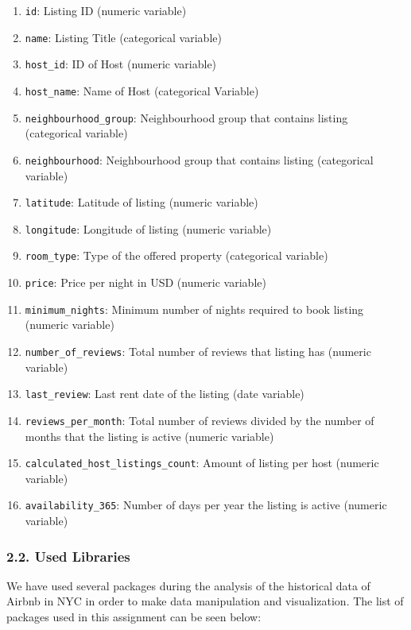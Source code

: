 \documentclass[
]{article}
\providecommand{\tightlist}{%
  \setlength{\itemsep}{0pt}\setlength{\parskip}{0pt}}
\begin{document}
\begin{enumerate}
\def\labelenumi{\arabic{enumi}.}
\tightlist
\item
  \texttt{id}: Listing ID (numeric variable)
\item
  \texttt{name}: Listing Title (categorical variable)
\item
  \texttt{host\_id}: ID of Host (numeric variable)
\item
  \texttt{host\_name}: Name of Host (categorical Variable)
\item
  \texttt{neighbourhood\_group}: Neighbourhood group that contains
  listing (categorical variable)
\item
  \texttt{neighbourhood}: Neighbourhood group that contains listing
  (categorical variable)
\item
  \texttt{latitude}: Latitude of listing (numeric variable)
\item
  \texttt{longitude}: Longitude of listing (numeric variable)
\item
  \texttt{room\_type}: Type of the offered property (categorical
  variable)
\item
  \texttt{price}: Price per night in USD (numeric variable)
\item
  \texttt{minimum\_nights}: Minimum number of nights required to book
  listing (numeric variable)
\item
  \texttt{number\_of\_reviews}: Total number of reviews that listing has
  (numeric variable)
\item
  \texttt{last\_review}: Last rent date of the listing (date variable)
\item
  \texttt{reviews\_per\_month}: Total number of reviews divided by the
  number of months that the listing is active (numeric variable)
\item
  \texttt{calculated\_host\_listings\_count}: Amount of listing per host
  (numeric variable)
\item
  \texttt{availability\_365}: Number of days per year the listing is
  active (numeric variable)
\end{enumerate}

\hypertarget{used-libraries}{%
\subsubsection{2.2. Used Libraries}\label{used-libraries}}

We have used several packages during the analysis of the historical data
of Airbnb in NYC in order to make data manipulation and visualization.
The list of packages used in this assignment can be seen below:
\end{document}
